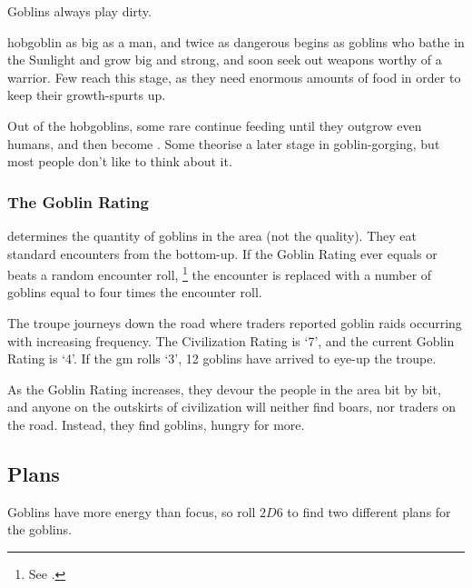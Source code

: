 \begin{multicols}{2}
Goblins always play dirty.



  {hobgoblin}%
  {as big as a man, and twice as dangerous}%
begins as goblins who bathe in the Sunlight and grow big and strong, and soon seek out weapons worthy of a warrior.
Few reach this stage, as they need enormous amounts of food in order to keep their growth-spurts up.

Out of the hobgoblins, some rare continue feeding until they outgrow even humans, and then become .
Some theorise a later stage in goblin-gorging, but most people don't like to think about it.

\subsubsection{The Goblin Rating}
\label{goblin_rating}
determines the quantity of goblins in the area (not the quality).
They eat standard encounters from the bottom-up.
If the Goblin Rating ever equals or beats a random encounter roll,%
\footnote{See .}
the encounter is replaced with a number of goblins equal to four times the encounter roll.

\begin{exampletext}
  The troupe journeys down the road where traders reported goblin raids occurring with increasing frequency.
  The Civilization Rating is `7', and the current Goblin Rating is `4'.
  If the \gls{gm} rolls `3', 12 goblins have arrived to eye-up the troupe.
\end{exampletext}

As the Goblin Rating increases, they devour the people in the area bit by bit, and anyone on the outskirts of civilization will neither find boars, nor traders on the road.
Instead, they find goblins, hungry for more.



\subsection{Plans}

Goblins have more energy than focus, so roll $2D6$ to find two different plans for the goblins.


\end{multicols}
